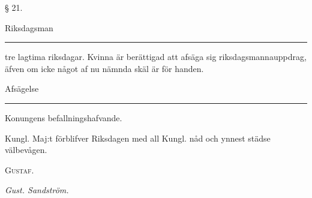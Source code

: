 \documentclass[a4paper]{article}
\renewcommand{\section}[1]{\begin{center}§ #1.\end{center}}
\begin{document}
\section{21}
Riksdagsman \rule[0.5ex]{2cm}{0.2ex} tre lagtima riksdagar.  Kvinna är
berättigad att afsäga sig riksdagsmannauppdrag, äfven om icke något af nu
nämnda skäl är för handen.

Afsägelse \rule[0.5ex]{2cm}{0.2ex} Konungens befallningshafvande.

Kungl. Maj:t förblifver Riksdagen med all Kungl. nåd och ynnest städse
välbevågen.

\vspace{2cm}
{\centering\Huge\scshape
        Gustaf.\\
}

{\raggedleft\itshape
        Gust. Sandström.\\
}
\end{document}

